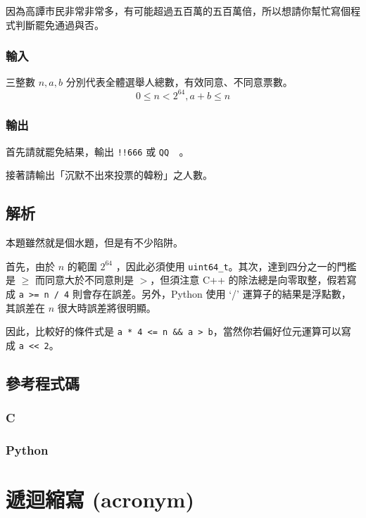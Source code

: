 \documentclass[a4paper,10pt]{article}
\begin{document}
因為高譚市民非常非常多，有可能超過五百萬的五百萬倍，所以想請你幫忙寫個程式判斷罷免通過與否。

\subsubsection{輸入}

三整數 $n, a, b$ 分別代表全體選舉人總數，有效同意、不同意票數。$$0 \leq n < 2^{64}, a + b \leq n$$

\subsubsection{輸出}

首先請就罷免結果，輸出 \texttt{!!666} 或 \texttt{QQ~~}。

接著請輸出「沉默不出來投票的韓粉」之人數。

\subsection{解析}

本題雖然就是個水題，但是有不少陷阱。

首先，由於 $n$ 的範圍 $2^{64}$ ，因此必須使用 \texttt{uint64\_t}。其次，達到四分之一的門檻是 $\geq$ 而同意大於不同意則是 $>$，但須注意 C++ 的除法總是向零取整，假若寫成 \texttt{a >= n / 4} 則會存在誤差。另外，Python 使用 `/' 運算子的結果是浮點數，其誤差在 $n$ 很大時誤差將很明顯。

因此，比較好的條件式是 \texttt{a * 4 <= n \&\& a > b}，當然你若偏好位元運算可以寫成 \texttt{a << 2}。

\subsection{參考程式碼}

\subsubsection{C}



\subsubsection{Python}



\section{遞迴縮寫 (acronym)}
\end{document}
